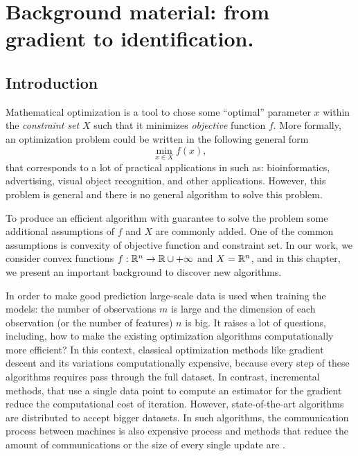 \chapter[Background material]{Background material: from gradient to identification.}
\label{ch:basics}
\localtableofcontents
\newpage
\section*{Introduction}
Mathematical optimization is a tool to chose some ``optimal'' parameter $x$ within the \emph{constraint set} $X$ such that it minimizes \emph{objective} function $f$. More formally, an optimization problem could be written in the following general form
$$
\min_{x\in X} f(x),
$$
that corresponds to a lot of practical applications in  such as: bioinformatics, advertising, visual object recognition, and other applications. However, this problem is general and there is no general algorithm to solve this problem.

To produce an efficient algorithm with guarantee to solve the problem some additional assumptions of $f$ and $X$ are commonly added. One of the common assumptions is  convexity of objective function and constraint set. In our work, we consider convex functions $f:\mathbb{R}^n\rightarrow \mathbb{R}\cup+\infty$ and $X = \mathbb{R}^n$, and in this chapter, we present an important background to discover new algorithms.

In order to make good prediction large-scale data is used when training the models: the number of observations $m$ is large and the dimension of each observation (or the number of features) $n$ is big. It raises a lot of questions, including, how to make the existing optimization algorithms computationally more efficient? In this context, classical optimization methods like gradient descent and its variations  computationally expensive, because every step of these algorithms requires  pass through the full dataset. In contrast, incremental methods, that use a single data point  to compute an estimator for the gradient reduce the computational cost of iteration. However,  state-of-the-art algorithms are distributed to accept bigger datasets. In such algorithms, the communication process between machines is also expensive process and methods that  reduce the amount of communications or the size of every single update are .


